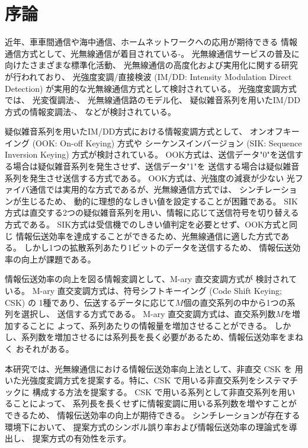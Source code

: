 ﻿\chapter{序論}
近年、車車間通信や海中通信、ホームネットワークへの応用が期待できる
情報通信方式として、光無線通信が着目されている\cite{ocdma1}-\cite{csk2}。
光無線通信サービスの普及に向けたさまざまな標準化活動、
光無線通信の高度化および実用化に関する研究が行われており、
光強度変調/直接検波 (IM/DD: Intensity Modulation Direct Detection) が実用的な光無線通信方式として検討されている。
光強度変調方式では、
光変復調法\cite{ocdma4}-\cite{scinti}、
光無線通信路のモデル化\cite{ocdma5}、
疑似雑音系列を用いたIM/DD方式の情報変調法\cite{ook}-\cite{sik2}、
などが検討されている。

疑似雑音系列を用いたIM/DD方式における情報変調方式として、
オンオフキーイング (OOK: On-off Keying) 方式\cite{ook}や
シーケンスインバージョン (SIK: Sequence Inversion Keying) 方式\cite{sik1}\cite{sik2}が検討されている。
OOK方式は、送信データ"0"を送信する場合は疑似雑音系列を発生させず、送信データ"1"を
送信する場合は疑似雑音系列を発生させ送信する方式である。
OOK方式は、光強度の減衰が少ない
光ファイバ通信では実用的な方式であるが、光無線通信方式では、
シンチレーションが生じるため\cite{scinti}、
動的に理想的なしきい値を設定することが困難である。
SIK方式は直交する2つの疑似雑音系列を用い、情報に応じて送信符号を切り替える
方式である\cite{sik1}\cite{sik2}。
SIK方式は受信機でのしきい値判定を必要とせず、OOK方式と同じ
情報伝送効率を達成することができるため、光無線通信に適した方式である。
しかし1つの拡散系列あたり1ビットのデータを送信するため、
情報伝送効率の向上が課題である。

情報伝送効率の向上を図る情報変調として、M-ary 直交変調方式が
検討されている\cite{csk1}\cite{csk2}。
M-ary 直交変調方式は、符号シフトキーイング (Code Shift Keying; CSK) の
1種であり、伝送するデータに応じて$M$個の直交系列の中から1つの系列を選択し、
送信する方式である。
M-ary 直交変調方式は、直交系列数$M$を増加することに
よって、系列あたりの情報量を増加させることができる。
しかし、系列数を増加させるには系列長を長く必要があるため、情報伝送効率をまねく
おそれがある。

本研究では、光無線通信における情報伝送効率向上法として、非直交 CSK を
用いた光強度変調方式を提案する。特に、CSK で用いる非直交系列をシステマチックに
構成する方法を提案する。
CSK で用いる系列として非直交系列を用いることによって、
系列長を長くせずに情報変調に用いる系列数を増やすことができるため、
情報伝送効率の向上が期待できる。
シンチレーションが存在する環境下において、
提案方式のシンボル誤り率および情報伝送効率の理論式を導出し、
提案方式の有効性を示す。
